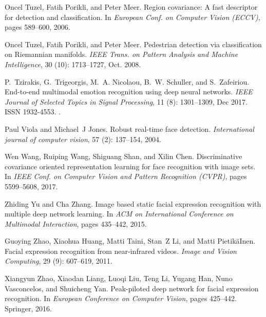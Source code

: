 \documentclass{bmvc2k}
\begin{document}
\begin{thebibliography}{29}
Oncel Tuzel, Fatih Porikli, and Peter Meer.
\newblock Region covariance: A fast descriptor for detection and
  classification.
\newblock In \emph{European Conf. on Computer Vision (ECCV)}, pages 589--600,
  2006.

Oncel Tuzel, Fatih Porikli, and Peter Meer.
\newblock Pedestrian detection via classification on {Riemannian} manifolds.
\newblock \emph{IEEE Trans. on Pattern Analysis and Machine Intelligence},
  30 (10): 1713--1727, Oct. 2008.

P.~Tzirakis, G.~Trigeorgis, M.~A. Nicolaou, B.~W. Schuller, and S.~Zafeiriou.
\newblock End-to-end multimodal emotion recognition using deep neural networks.
\newblock \emph{IEEE Journal of Selected Topics in Signal Processing},
  11 (8): 1301--1309, Dec 2017.
\newblock ISSN 1932-4553.
\newblock {}.

Paul Viola and Michael~J Jones.
\newblock Robust real-time face detection.
\newblock \emph{International journal of computer vision}, 57
  (2): 137--154, 2004.

Wen Wang, Ruiping Wang, Shiguang Shan, and Xilin Chen.
\newblock Discriminative covariance oriented representation learning for face
  recognition with image sets.
\newblock In \emph{IEEE Conf. on Computer Vision and Pattern Recognition
  (CVPR)}, pages 5599--5608, 2017.

Zhiding Yu and Cha Zhang.
\newblock Image based static facial expression recognition with multiple deep
  network learning.
\newblock In \emph{ACM on International Conference on Multimodal Interaction},
  pages 435--442, 2015.

Guoying Zhao, Xiaohua Huang, Matti Taini, Stan~Z Li, and Matti Pietik{\"a}Inen.
\newblock Facial expression recognition from near-infrared videos.
\newblock \emph{Image and Vision Computing}, 29 (9):
  607--619, 2011.

Xiangyun Zhao, Xiaodan Liang, Luoqi Liu, Teng Li, Yugang Han, Nuno Vasconcelos,
  and Shuicheng Yan.
\newblock Peak-piloted deep network for facial expression recognition.
\newblock In \emph{European Conference on Computer Vision}, pages 425--442.
  Springer, 2016.

\end{thebibliography}
\end{document}
